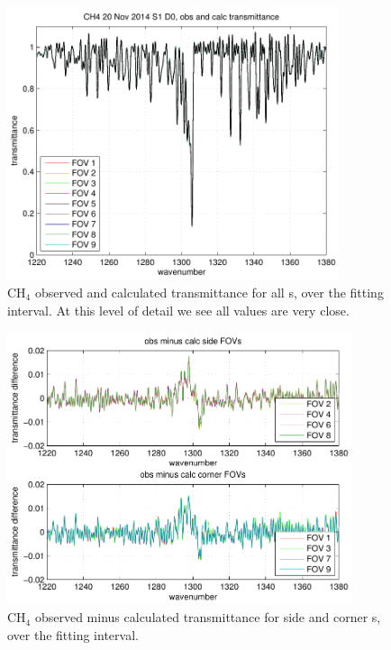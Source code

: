 \documentclass[12pt]{article}
\begin{document}

\begin{figure}
  \centering
  \includegraphics[height=8cm]{figures/CH4_obs_and_calc.pdf}
  \caption{CH$_4$ observed and calculated transmittance for all
    {\fov}s, over the fitting interval.  At this level of detail we see
    all values are very close.}
\end{figure}


\begin{figure}
  \centering
  \includegraphics[height=8cm]{figures/CH4_breakout_2.pdf}
  \caption{CH$_4$ observed minus calculated transmittance for side
    and corner {\fov}s, over the fitting interval.}
\end{figure}

\end{document}
